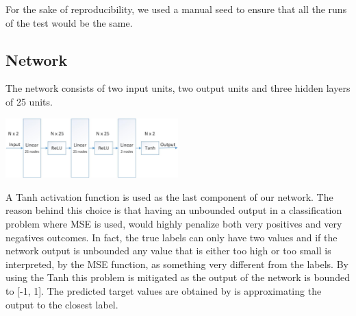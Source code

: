 \documentclass[10pt,conference,compsocconf]{IEEEtran}
\begin{document}
For the sake of reproducibility, we used a manual seed to ensure that all the runs of the test would be the same.

\subsection{Network}
The network consists of two input units, two output units and three hidden layers of 25 units.

\begin{center}
	\captionsetup{type=figure}
	\includegraphics[width=0.5\textwidth]{img/Network.jpg}
	\label{fig:network}
\end{center} 

A Tanh activation function is used as the last component of our network. The reason behind this choice is that having an unbounded output in a classification problem where MSE is used, would highly penalize both very positives and very negatives outcomes. In fact, the true labels can only have two values and if the network output is unbounded any value that is either too high or too small is interpreted, by the MSE function, as something very different from the labels. By using the Tanh this problem is mitigated as the output of the network is bounded to [-1, 1]. The predicted target values are obtained by is approximating the output to the closest label.
\end{document}
